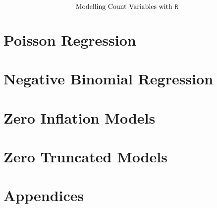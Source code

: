 \documentclass{beamer}
\begin{document}
\begin{frame}
	\huge
	\[ \mbox{Modelling Count Variables with \texttt{R} } \]
	\end{frame}





\section{Poisson Regression}




% 

\section{Negative Binomial Regression}


% 
\section{Zero Inflation Models}

% 


% 
\section{Zero Truncated Models}




\section*{Appendices}
%
\end{document}
